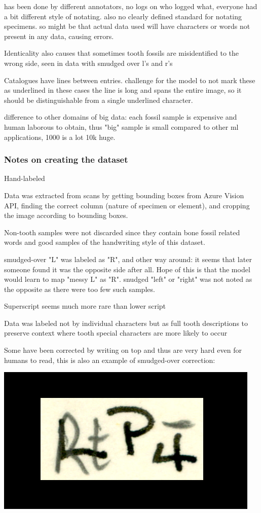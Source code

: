 \documentclass{article}
\begin{document}
has been done by different annotators, no logs on who logged what, everyone 
had a bit different style of notating. also no clearly defined standard 
for notating specimens. so might be that actual data used will have 
characters or words not present in any data, causing errors.


Identicality also causes that sometimes tooth fossils are misidentified to 
the wrong side, seen in data with smudged over l's and r's

Catalogues have lines between entries. challenge for the model to not mark these as underlined
in these cases the line is long and spans the entire image, so it should be distinguishable from 
a single underlined character.

difference to other domains of big data:
each fossil sample is expensive and human laborous to obtain, thus "big" sample is 
small compared to other ml applications, 1000 is a lot 10k huge.

\subsubsection{Notes on creating the dataset}

Hand-labeled

Data was extracted from scans by getting bounding boxes from Azure Vision API,
finding the correct column (nature of specimen or element), and cropping the image 
according to bounding boxes.

Non-tooth samples were not discarded since they contain 
bone fossil related words and good samples of the handwriting style of this dataset.

smudged-over "L" was labeled as "R", and other way around: it seems that later 
someone found it was the opposite side after all. Hope of this is that the model 
would learn to map "messy L" as "R". snudged "left" or "right" was not noted as the 
opposite as there were too few such samples.

Superscript seems much more rare than lower script

Data was labeled not by individual characters but as full tooth descriptions
to preserve context where tooth special characters are more likely to occur

Some have been corrected by writing on top and thus are very hard 
even for humans to read, this is also an example of smudged-over correction: 

\includegraphics*[scale=0.2]{../images/superambiguous_data_sample.png}
\end{document}
